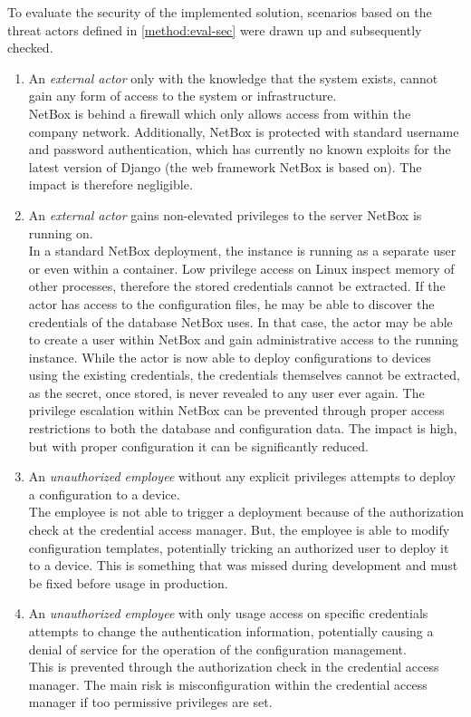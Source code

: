 To evaluate the security of the implemented solution, scenarios based on
the threat actors defined in \ref{method:eval-sec} were drawn up and
subsequently checked.


\begin{enumerate}[label=S.\arabic*]
  \item An {\it external actor} only with the knowledge
  that the system exists, cannot gain any form of access to the system or infrastructure. \\
  NetBox is behind a firewall which only allows access from within the company network.
  Additionally, NetBox is protected with standard username and password authentication,
  which has currently no known exploits for the latest version of Django (the web framework NetBox is based on).
  The impact is therefore negligible.

  \item An {\it external actor} gains non-elevated privileges to the server NetBox is running on. \\
  In a standard NetBox deployment, the instance is running as a separate user or even within a container.
  Low privilege access on Linux inspect memory of other processes, therefore the stored credentials
  cannot be extracted. If the actor has access to the configuration files, he may be able to discover the credentials of the
  database NetBox uses. In that case, the actor may be able to create a user within NetBox and gain administrative access
  to the running instance. While the actor is now able to deploy configurations to devices using the existing credentials,
  the credentials themselves cannot be extracted, as the secret, once stored, is never revealed to any user ever again.
  The privilege escalation within NetBox can be prevented through proper access restrictions to both the database
  and configuration data.
  The impact is high, but with proper configuration it can be significantly reduced.

  \item An {\it unauthorized employee} without any explicit privileges attempts to deploy a configuration to a device. \\
  The employee is not able to trigger a deployment because of the authorization check at the credential access manager.
  But, the employee is able to modify configuration templates, potentially tricking an authorized user to deploy it to a device.
  This is something that was missed during development and must be fixed before usage in production.

  \item An {\it unauthorized employee} with only usage access on specific credentials attempts to change the authentication information,
  potentially causing a denial of service for the operation of the configuration management. \\
  This is prevented through the authorization check in the credential access manager. The main risk is misconfiguration within the
  credential access manager if too permissive privileges are set.

\end{enumerate}


